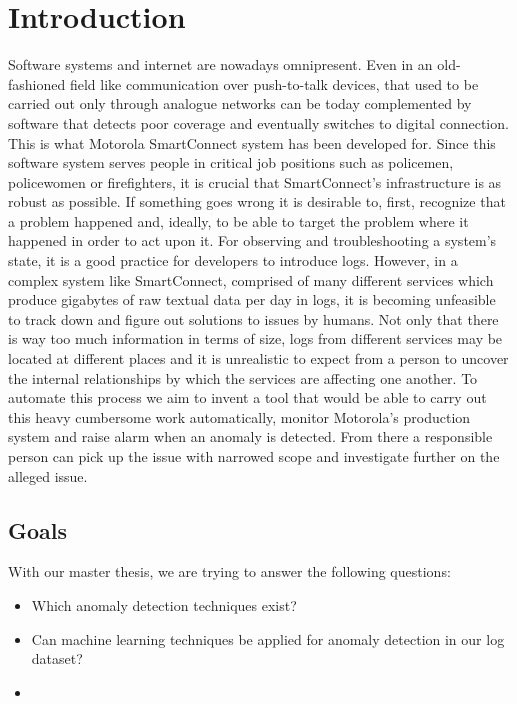 \chapter{Introduction}
\label{introduction}

Software systems and internet are nowadays omnipresent. 
Even in an old-fashioned field like communication over push-to-talk devices, that used to be carried out only through analogue networks can be today complemented by software that detects poor coverage and eventually switches to digital connection. 
This is what Motorola SmartConnect system has been developed for. Since this software system serves people in critical job positions such as policemen, policewomen or firefighters, it is crucial that SmartConnect's infrastructure is as robust as possible. If something goes wrong it is desirable to, first, recognize that a problem happened and, ideally, to be able to target the problem where it happened in order to act upon it.
For observing and troubleshooting a system's state, it is a good practice for developers to introduce logs.
However, in a complex system like SmartConnect, comprised of many different services which produce gigabytes of raw textual data per day in logs, it is becoming unfeasible to track down and figure out solutions to issues by humans.
Not only that there is way too much information in terms of size, logs from different services may be located at different places and it is unrealistic to expect from a person to uncover the internal relationships by which the services are affecting one another.
To automate this process we aim to invent a tool that would be able to carry out this heavy cumbersome work automatically, monitor Motorola's production system and raise alarm when an anomaly is detected.
From there a responsible person can pick up the issue with narrowed scope and investigate further on the alleged issue.


\section{Goals}
With our master thesis, we are trying to answer the following questions: 
\begin{itemize}
    \item Which anomaly detection techniques exist?
    \item Can machine learning techniques be applied for anomaly detection in our log dataset?
    \item 
\end{itemize}

